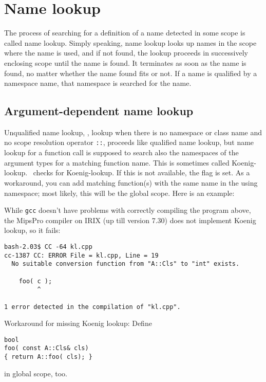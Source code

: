 \section{Name lookup}
The process of searching for a definition of a name detected in
some scope is called name lookup.
Simply speaking, name lookup looks 
up names in the scope where the name is used, 
and if not found, the lookup proceeds in successively enclosing scope 
until the name is found. It terminates as soon as the name is found, no
matter whether the name found fits or not.
If a name is qualified by a namespace name, that namespace is searched
for the name.

\subsection{Argument-dependent name lookup}
%
Unqualified name lookup, \ie, lookup when there is no namespace or class
name and no scope resolution%
 operator \verb+::+, proceeds like qualified 
name lookup, but name lookup for a function call is supposed to search also 
the namespaces of the argument types for a matching function name. 
This is sometimes called Koenig-lookup.
\cgal\ checks for Koenig-lookup. If this is not available, 
the flag %
is set. As a workaround,
you can add matching function(s) with the same name in the using namespace; 
most likely, this will be the global scope.
Here is an example:


While \verb+gcc+ doesn't have problems with correctly compiling the program
above, the MipsPro compiler on {\sc IRIX} (up till version 7.30) does not
implement Koenig lookup, so it fails:

{\small
\begin{verbatim}
bash-2.03$ CC -64 kl.cpp  
cc-1387 CC: ERROR File = kl.cpp, Line = 19
  No suitable conversion function from "A::Cls" to "int" exists.

    foo( c );
         ^

1 error detected in the compilation of "kl.cpp".
\end{verbatim}

}
Workaround for missing Koenig lookup:
Define 
\begin{verbatim}
bool
foo( const A::Cls& cls)
{ return A::foo( cls); }
\end{verbatim}
in global scope, too.


